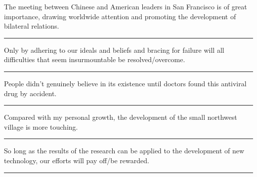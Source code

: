 \documentclass[11pt,a4paper]{article}
\newcommand{\num}[1]{\makebox[1.9em][r]{#1.}\hspace{0.3em}}
\newcommand{\wline}{\noindent\rule{\linewidth}{0.4pt}}
\begin{document}
\begin{minipage}{\linewidth}

\num{19}The meeting between Chinese and American leaders in San Francisco is of great importance, drawing worldwide attention and promoting the development of bilateral relations.

\vspace{0.25em}

\wline

\end{minipage}

\begin{minipage}{\linewidth}

\num{20}Only by adhering to our ideals and beliefs and bracing for failure will all difficulties that seem insurmountable be resolved/overcome.

\vspace{0.25em}

\wline

\end{minipage}

\vspace{0.35em}\vspace{0.15em}

\begin{minipage}{\linewidth}

\num{21}People didn’t genuinely believe in its existence until doctors found this antiviral drug by accident.

\vspace{0.25em}

\wline

\end{minipage}

\begin{minipage}{\linewidth}

\num{22}Compared with my personal growth, the development of the small northwest village is more touching.

\vspace{0.25em}

\wline

\end{minipage}

\begin{minipage}{\linewidth}

\num{23}So long as the results of the research can be applied to the development of new technology, our efforts will pay off/be rewarded.

\vspace{0.25em}

\wline

\end{minipage}
\end{document}
